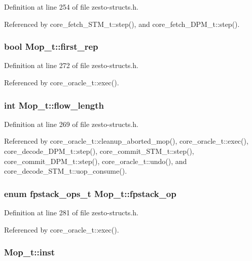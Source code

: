 Definition at line 254 of file zesto-structs.h.

Referenced by core\_\-fetch\_\-STM\_\-t::step(), and core\_\-fetch\_\-DPM\_\-t::step().
\subsubsection[{first\_\-rep}]{\setlength{\rightskip}{0pt plus 5cm}bool {\bf Mop\_\-t::first\_\-rep}}\label{structMop__t_63b2a1a4d6f27a1bd3b6c3ca831f16b2}




Definition at line 272 of file zesto-structs.h.

Referenced by core\_\-oracle\_\-t::exec().
\subsubsection[{flow\_\-length}]{\setlength{\rightskip}{0pt plus 5cm}int {\bf Mop\_\-t::flow\_\-length}}\label{structMop__t_7718f3555efe88921d86e395fc3fbc74}




Definition at line 269 of file zesto-structs.h.

Referenced by core\_\-oracle\_\-t::cleanup\_\-aborted\_\-mop(), core\_\-oracle\_\-t::exec(), core\_\-decode\_\-DPM\_\-t::step(), core\_\-commit\_\-STM\_\-t::step(), core\_\-commit\_\-DPM\_\-t::step(), core\_\-oracle\_\-t::undo(), and core\_\-decode\_\-STM\_\-t::uop\_\-consume().
\subsubsection[{fpstack\_\-op}]{\setlength{\rightskip}{0pt plus 5cm}enum {\bf fpstack\_\-ops\_\-t} {\bf Mop\_\-t::fpstack\_\-op}}\label{structMop__t_7fb3398e3b0132467e40c95cb551db96}




Definition at line 281 of file zesto-structs.h.

Referenced by core\_\-oracle\_\-t::exec().
\subsubsection[{inst}]{ {\bf Mop\_\-t::inst}}\label{structMop__t_268a8bdf9dc08de70db61fbbdd52480d}




